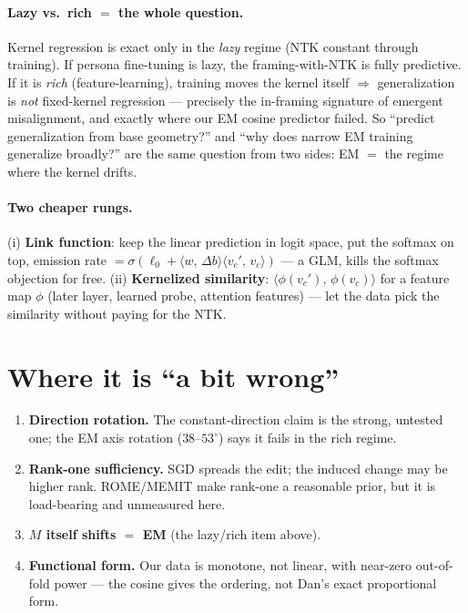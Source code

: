 \documentclass[11pt]{article}
\newcommand{\ip}[2]{\langle #1,\, #2\rangle}
\newcommand{\db}{\Delta b}
\begin{document}
\paragraph{Lazy vs.\ rich $=$ the whole question.} Kernel regression is exact only in the
\emph{lazy} regime (NTK constant through training). If persona fine-tuning is lazy, the
framing-with-NTK is fully predictive. If it is \emph{rich} (feature-learning), training
moves the kernel itself $\Rightarrow$ generalization is \emph{not} fixed-kernel
regression --- precisely the in-framing signature of emergent misalignment, and exactly
where our EM cosine predictor failed. So ``predict generalization from base geometry?''
and ``why does narrow EM training generalize broadly?'' are the same question from two
sides: EM $=$ the regime where the kernel drifts.

\paragraph{Two cheaper rungs.} (i) \textbf{Link function}: keep the linear prediction in
logit space, put the softmax on top, emission rate $=\sigma(\ell_0+\ip{w}{\db}\ip{v_c'}{v_c})$
--- a GLM, kills the softmax objection for free. (ii) \textbf{Kernelized similarity}:
$\ip{\phi(v_c')}{\phi(v_c)}$ for a feature map $\phi$ (later layer, learned probe,
attention features) --- let the data pick the similarity without paying for the NTK.

\section*{Where it is ``a bit wrong''}

\begin{enumerate}[leftmargin=1.4em]
  \item \textbf{Direction rotation.} The constant-direction claim is the strong, untested
  one; the EM axis rotation ($38\text{–}53^\circ$) says it fails in the rich regime.
  \item \textbf{Rank-one sufficiency.} SGD spreads the edit; the induced change may be
  higher rank. ROME/MEMIT make rank-one a reasonable prior, but it is load-bearing and
  unmeasured here.
  \item \textbf{$M$ itself shifts $=$ EM} (the lazy/rich item above).
  \item \textbf{Functional form.} Our data is monotone, not linear, with near-zero
  out-of-fold power --- the cosine gives the ordering, not Dan's exact proportional form.
\end{enumerate}
\end{document}

